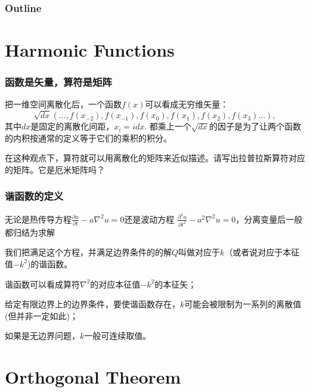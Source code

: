 \documentclass[CJK]{beamer}
\date{}
\begin{document}
  \bch
{}

\begin{frame}
  \frametitle{Outline}
  \tableofcontents
\end{frame}

\section{Harmonic Functions}


\begin{frame}
  \frametitle{函数是矢量，算符是矩阵}
  把一维空间离散化后，一个函数$f(x)$可以看成无穷维矢量：
  $$\sqrt{dx} \left( \ldots, f(x_{-2}), f(x_{-1}), f(x_0), f(x_1), f(x_2) , f(x_3)\ldots \right), $$
  其中$dx$是固定的离散化间距，$x_i = i dx$. 都乘上一个$\sqrt{dx}$的因子是为了让两个函数的内积按通常的定义等于它们的乘积的积分。

  
  在这种观点下，算符就可以用离散化的矩阵来近似描述。请写出拉普拉斯算符对应的矩阵。它是厄米矩阵吗？
  
\end{frame}

\begin{frame}
\frametitle{谐函数的定义}
无论是热传导方程$\frac{\partial u}{\partial t} -a \nabla^2u = 0$还是波动方程
$\frac{\partial^2u }{\partial t^2} - a^2 \nabla^2 u = 0$，分离变量后一般都归结为求解

我们把{\blue 满足这个方程，并满足边界条件的的解$Q$叫做对应于$k$（或者说对应于本征值$-k^2$)的谐函数。}

\bitem
\item{谐函数可以看成算符$\nabla^2$的对应本征值$-k^2$的本征矢；}
\item{给定有限边界上的边界条件，要使谐函数存在，$k$可能会被限制为一系列的离散值(但并非一定如此)；}
\item{如果是无边界问题，$k$一般可连续取值。}
\eitem


\end{frame}

\section{Orthogonal Theorem}
\end{document}
